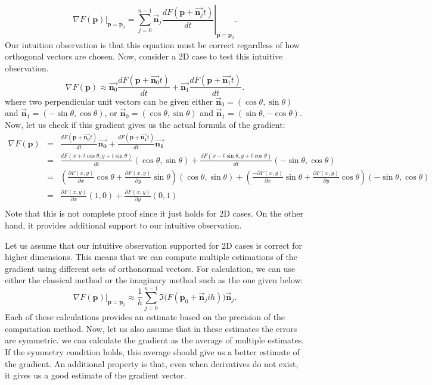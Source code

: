 \documentclass{article}
\begin{document}
$$ 
\nabla F(\mathbf{p})|_{\mathbf{p}=\mathbf{p}_0} = \sum_{j=0}^{n-1} \vec{\mathbf{n}}_j \left. \frac{dF(\mathbf{p} + \vec{\mathbf{n}_j}t)}{dt} \right|_{\mathbf{p}=\mathbf{p}_0}. 
$$
Our intuition observation is that this equation must be correct regardless of how orthogonal vectors are chosen. Now, consider a 2D case to test this intuitive observation. 
$$ 
\nabla F(\mathbf{p}) \approx \vec{\mathbf{n}_0}  \frac{dF(\mathbf{p} + \vec{\mathbf{n}_0}t)}{dt}  + 
\vec{\mathbf{n}_1}  \frac{dF(\mathbf{p} + \vec{\mathbf{n}_1}t)}{dt} . 
$$
where two perpendicular unit vectors can be given either $\vec{\mathbf{n}}_0 = (\cos \theta, \sin \theta )$ and $\vec{\mathbf{n}}_1 = ( -\sin \theta, \cos \theta )$, or $\vec{\mathbf{n}}_0 = (\cos \theta, \sin \theta )$ and $\vec{\mathbf{n}}_1 = ( \sin \theta, -\cos \theta )$. 
Now, let us check if this gradient gives us the actual formula of the gradient: 
\begin{eqnarray} 
\nabla F(\mathbf{p})  & = &  \frac{dF(\mathbf{p} + \vec{\mathbf{n_0}}t)}{dt} \vec{\mathbf{n_0}}+
 \frac{dF(\mathbf{p} + \vec{\mathbf{n_1}}t)}{dt} \vec{\mathbf{n_1}} \nonumber\\ 
& = &  \frac{dF(x+t\cos \theta, y+ t\sin \theta )}{dt} (\cos \theta, \sin \theta )+
 \frac{dF(x-t\sin \theta, y+ t\cos \theta )}{dt} (-\sin \theta,\cos \theta ) \nonumber \\ 
& = &  \left(\frac{\partial F(x,y)}{\partial x} \cos \theta + \frac{\partial F(x,y)}{\partial y} \sin \theta \right) (\cos \theta, \sin \theta ) +
\left( \frac{-\partial F(x,y)}{\partial x} \sin \theta + \frac{\partial F(x,y)}{\partial y} \cos \theta \right) (-\sin \theta, \cos \theta ) \nonumber \\
&= & \frac{\partial F(x,y)}{\partial x} (1,0) +\frac{\partial F(x,y)}{\partial y}  (0,1)\nonumber \\
\end{eqnarray}
Note that this is not complete proof since it just holds for 2D cases. On the other hand, it provides additional support to our intuitive observation. 

Let us assume that our intuitive observation supported for 2D cases is correct for higher dimensions. This means that we can compute multiple estimations of the gradient using different sets of orthonormal vectors. For calculation, we can use either the classical method or the imaginary method such as the one given below: 
$$ \nabla F(\mathbf{p})|_{\mathbf{p}=\mathbf{p}_0} \approx \frac{1}{h} \sum_{j=0}^{n-1} \Im \bigl( F (\mathbf{p}_0 + \vec{\mathbf{n}}_j i h ) \bigr) \vec{\mathbf{n}}_j . $$
Each of these calculations provides an estimate based on the precision of the computation method. Now, let us also assume that in these estimates the errors are symmetric. we can calculate the gradient as the average of multiple estimates. If the symmetry condition holds, this average should give us a better estimate of the gradient. An additional property is that, even when derivatives do not exist, it gives us a good estimate of the gradient vector. 
\end{document}
